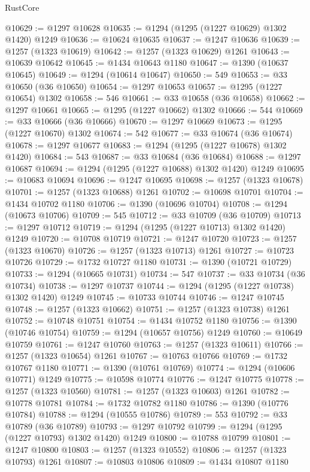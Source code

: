 \begin{lexlean}{RustCore}
\begin{coremodule}
@10629 := @1297 @10628
@10635 := @1294 (@1295 (@1227 @10629) @1302 @1420) @1249
@10636 := @10624 @10635
@10637 := @1247 @10636
@10639 := @1257 (@1323 @10619)
@10642 := @1257 (@1323 @10629) @1261
@10643 := @10639 @10642
@10645 := @1434 @10643 @1180
@10647 := @1390 (@10637 @10645)
@10649 := @1294 (@10614 @10647)
@10650 := 549
@10653 := @33 @10650 (@36 @10650)
@10654 := @1297 @10653
@10657 := @1295 (@1227 @10654) @1302
@10658 := 546
@10661 := @33 @10658 (@36 @10658)
@10662 := @1297 @10661
@10665 := @1295 (@1227 @10662) @1302
@10666 := 544
@10669 := @33 @10666 (@36 @10666)
@10670 := @1297 @10669
@10673 := @1295 (@1227 @10670) @1302
@10674 := 542
@10677 := @33 @10674 (@36 @10674)
@10678 := @1297 @10677
@10683 := @1294 (@1295 (@1227 @10678) @1302 @1420)
@10684 := 543
@10687 := @33 @10684 (@36 @10684)
@10688 := @1297 @10687
@10694 := @1294 (@1295 (@1227 @10688) @1302 @1420) @1249
@10695 := @10683 @10694
@10696 := @1247 @10695
@10698 := @1257 (@1323 @10678)
@10701 := @1257 (@1323 @10688) @1261
@10702 := @10698 @10701
@10704 := @1434 @10702 @1180
@10706 := @1390 (@10696 @10704)
@10708 := @1294 (@10673 @10706)
@10709 := 545
@10712 := @33 @10709 (@36 @10709)
@10713 := @1297 @10712
@10719 := @1294 (@1295 (@1227 @10713) @1302 @1420) @1249
@10720 := @10708 @10719
@10721 := @1247 @10720
@10723 := @1257 (@1323 @10670)
@10726 := @1257 (@1323 @10713) @1261
@10727 := @10723 @10726
@10729 := @1732 @10727 @1180
@10731 := @1390 (@10721 @10729)
@10733 := @1294 (@10665 @10731)
@10734 := 547
@10737 := @33 @10734 (@36 @10734)
@10738 := @1297 @10737
@10744 := @1294 (@1295 (@1227 @10738) @1302 @1420) @1249
@10745 := @10733 @10744
@10746 := @1247 @10745
@10748 := @1257 (@1323 @10662)
@10751 := @1257 (@1323 @10738) @1261
@10752 := @10748 @10751
@10754 := @1434 @10752 @1180
@10756 := @1390 (@10746 @10754)
@10759 := @1294 (@10657 @10756) @1249
@10760 := @10649 @10759
@10761 := @1247 @10760
@10763 := @1257 (@1323 @10611)
@10766 := @1257 (@1323 @10654) @1261
@10767 := @10763 @10766
@10769 := @1732 @10767 @1180
@10771 := @1390 (@10761 @10769)
@10774 := @1294 (@10606 @10771) @1249
@10775 := @10598 @10774
@10776 := @1247 @10775
@10778 := @1257 (@1323 @10560)
@10781 := @1257 (@1323 @10603) @1261
@10782 := @10778 @10781
@10784 := @1732 @10782 @1180
@10786 := @1390 (@10776 @10784)
@10788 := @1294 (@10555 @10786)
@10789 := 553
@10792 := @33 @10789 (@36 @10789)
@10793 := @1297 @10792
@10799 := @1294 (@1295 (@1227 @10793) @1302 @1420) @1249
@10800 := @10788 @10799
@10801 := @1247 @10800
@10803 := @1257 (@1323 @10552)
@10806 := @1257 (@1323 @10793) @1261
@10807 := @10803 @10806
@10809 := @1434 @10807 @1180

\end{coremodule}
\end{lexlean}
